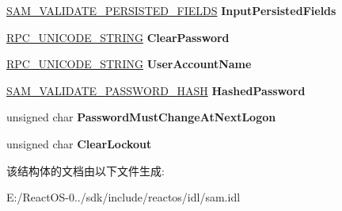\begin{DoxyCompactItemize}
\item 
\mbox{\label{struct___s_a_m___v_a_l_i_d_a_t_e___p_a_s_s_w_o_r_d___r_e_s_e_t___i_n_p_u_t___a_r_g_a4dca671bd4b920b8e7fd91017894c8d3}} 
\hyperlink{struct___s_a_m___v_a_l_i_d_a_t_e___p_e_r_s_i_s_t_e_d___f_i_e_l_d_s}{S\+A\+M\+\_\+\+V\+A\+L\+I\+D\+A\+T\+E\+\_\+\+P\+E\+R\+S\+I\+S\+T\+E\+D\+\_\+\+F\+I\+E\+L\+DS} {\bfseries Input\+Persisted\+Fields}
\item 
\mbox{\label{struct___s_a_m___v_a_l_i_d_a_t_e___p_a_s_s_w_o_r_d___r_e_s_e_t___i_n_p_u_t___a_r_g_a402271d615536abd4a710148af67dd7c}} 
\hyperlink{struct___r_p_c___u_n_i_c_o_d_e___s_t_r_i_n_g}{R\+P\+C\+\_\+\+U\+N\+I\+C\+O\+D\+E\+\_\+\+S\+T\+R\+I\+NG} {\bfseries Clear\+Password}
\item 
\mbox{\label{struct___s_a_m___v_a_l_i_d_a_t_e___p_a_s_s_w_o_r_d___r_e_s_e_t___i_n_p_u_t___a_r_g_a0d6c789a8c475dd7b4f778aafb32d5d9}} 
\hyperlink{struct___r_p_c___u_n_i_c_o_d_e___s_t_r_i_n_g}{R\+P\+C\+\_\+\+U\+N\+I\+C\+O\+D\+E\+\_\+\+S\+T\+R\+I\+NG} {\bfseries User\+Account\+Name}
\item 
\mbox{\label{struct___s_a_m___v_a_l_i_d_a_t_e___p_a_s_s_w_o_r_d___r_e_s_e_t___i_n_p_u_t___a_r_g_ac475d02deb8a1e4be9daac38190e810c}} 
\hyperlink{struct___s_a_m___v_a_l_i_d_a_t_e___p_a_s_s_w_o_r_d___h_a_s_h}{S\+A\+M\+\_\+\+V\+A\+L\+I\+D\+A\+T\+E\+\_\+\+P\+A\+S\+S\+W\+O\+R\+D\+\_\+\+H\+A\+SH} {\bfseries Hashed\+Password}
\item 
\mbox{\label{struct___s_a_m___v_a_l_i_d_a_t_e___p_a_s_s_w_o_r_d___r_e_s_e_t___i_n_p_u_t___a_r_g_a55fda7f06f1fa3608164e961e1eaf8c7}} 
unsigned char {\bfseries Password\+Must\+Change\+At\+Next\+Logon}
\item 
\mbox{\label{struct___s_a_m___v_a_l_i_d_a_t_e___p_a_s_s_w_o_r_d___r_e_s_e_t___i_n_p_u_t___a_r_g_abb7d73dd3879b8b9f94f8464972e5485}} 
unsigned char {\bfseries Clear\+Lockout}
\end{DoxyCompactItemize}


该结构体的文档由以下文件生成\+:\begin{DoxyCompactItemize}
\item 
E\+:/\+React\+O\+S-\/0../sdk/include/reactos/idl/sam.\+idl\end{DoxyCompactItemize}
